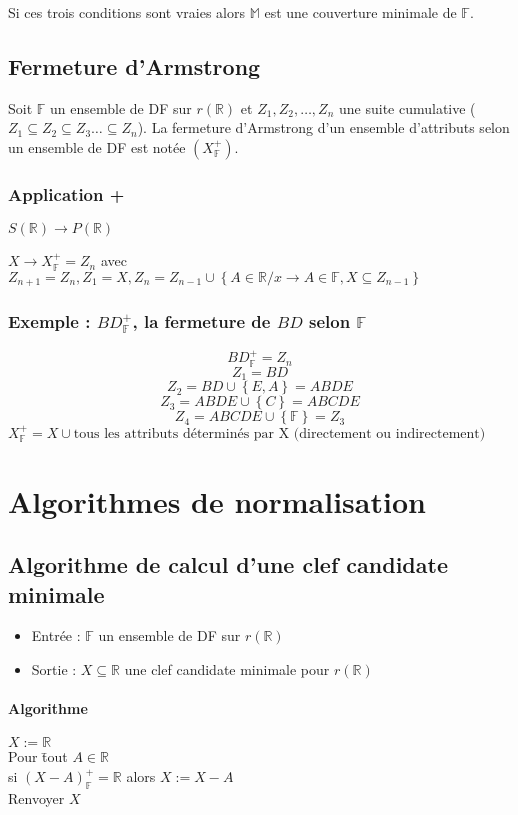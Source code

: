 \documentclass[10pt]{article}
\begin{document}
			Si ces trois conditions sont vraies alors $\mathbb{M}$ est une couverture minimale de $\mathbb{F}$.
			
		\subsection{Fermeture d'Armstrong}
			Soit $\mathbb{F}$ un ensemble de DF sur $r(\mathbb{R})$ et $Z_1,Z_2,\hdots,Z_n$ une suite cumulative ($Z_1\subseteq Z_2\subseteq Z_3\hdots\subseteq Z_n$). La fermeture d'Armstrong d'un ensemble d'attributs selon un ensemble de DF est notée $(X^+_\mathbb{F})$.
			
			\subsubsection{Application +}
				$S(\mathbb{R})\rightarrow P(\mathbb{R})$
				
				$X\rightarrow X^+_\mathbb{F}=Z_n$ avec $Z_{n+1}=Z_n, Z_1=X, Z_n=Z_{n-1}\cup\left\{A\in\mathbb{R}/x\rightarrow A\in\mathbb{F},X\subseteq Z_{n-1}\right\}$
				
			\subsubsection{Exemple : $BD^+_\mathbb{F}$, la fermeture de $BD$ selon $\mathbb{F}$}
				$$BD^+_\mathbb{F}=Z_n$$
				$$Z_1=BD$$
				$$Z_2=BD\cup\left\{E,A\right\}=ABDE$$
				$$Z_3=ABDE\cup\left\{C\right\}=ABCDE$$
				$$Z_4=ABCDE\cup\left\{\mathbb{F}\right\}=Z_3$$
				$X^+_\mathbb{F}=X\cup\text{tous les attributs déterminés par X (directement ou indirectement)}$
			
	\section{Algorithmes de normalisation}
		\subsection{Algorithme de calcul d'une clef candidate minimale}
			\begin{itemize}
				\item Entrée : $\mathbb{F}$ un ensemble de DF sur $r(\mathbb{R})$
				\item Sortie : $X\subseteq\mathbb{R}$ une clef candidate minimale pour $r(\mathbb{R})$
			\end{itemize}
			
			\paragraph{Algorithme}
			\begin{tabbing}
				$X:=\mathbb{R}$\\
				Pour \= tout $A\in\mathbb{R}$\\
				\> si $(X-A)^+_\mathbb{F}=\mathbb{R}$ alors $X:=X-A$\\
				Renvoyer $X$
			\end{tabbing}
			
\end{document}
